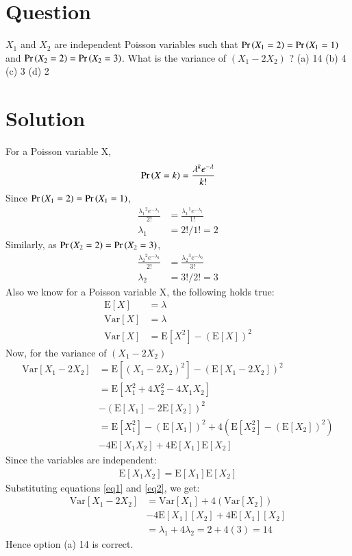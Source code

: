 \documentclass[journal,12pt,twocolumn]{IEEEtran}
\newcommand{\E}{\mathrm{E}}
\newcommand{\Var}{\mathrm{Var}}
\begin{document}
\section*{Question}
$X_1$ and $X_2$ are independent Poisson variables such that $\Pr\left(X_1=2\right) = \Pr\left(X_1=1\right)$ and $\Pr\left(X_2=2\right) = \Pr\left(X_2=3\right)$. What is the variance of $(X_1 - 2X_2)$ ?
\newline (a) 14
\newline (b) 4
\newline (c) 3
\newline (d) 2
\section*{Solution}
For a Poisson variable X,
\begin{align}
\Pr\left(X=k\right) = \frac{\lambda^{k}e^{-\lambda}}{k!}
\end{align}
Since $\Pr\left(X_1=2\right) = \Pr\left(X_1=1\right)$,
\begin{align}
\frac{{\lambda_1}^{2}e^{-{\lambda_1}}}{2!} &= \frac{{\lambda_1}^{1}e^{-{\lambda_1}}}{1!} \\
\lambda_1 &= 2!/1! = 2
\end{align}
Similarly, as $\Pr\left(X_2=2\right) = \Pr\left(X_2=3\right)$,
\begin{align}
\frac{{\lambda_2}^{2}e^{-{\lambda_2}}}{2!} &= \frac{{\lambda_2}^{3}e^{-{\lambda_2}}}{3!} \\
\lambda_2 &= 3!/2! = 3
\end{align}
Also we know for a Poisson variable X, the following holds true:
\begin{align}
\E[X] &= \lambda \\
\Var[X] &= \lambda \label{eq1} \\
\Var[X] &= \E[X^2] - (\E[X])^2 \label{eq2} 
\end{align}
Now, for the variance of $(X_1 - 2X_2)$
\begin{align}
\Var[X_1 - 2X_2] &= \E[(X_1 - 2X_2)^2] - (\E[X_1 - 2X_2])^2 \nonumber \\
&= \E[X_1^2 + 4X_2^2 - 4X_1X_2] \nonumber \\
&- (\E[X_1] - 2\E[X_2])^2 \nonumber \\
&= \E[X_1^2] - (\E[X_1])^2 + 4(\E[X_2^2]-(\E[X_2])^2) \nonumber \\
&- 4\E[X_1X_2]  + 4\E[X_1]\E[X_2]
\end{align}
Since the variables are independent:
\begin{align}
\E[X_1X_2] = \E[X_1]\E[X_2]
\end{align}
Substituting equations \eqref{eq1} and \eqref{eq2}, we get:
\begin{align}
\Var[X_1 - 2X_2] &= \Var[X_1] + 4(\Var[X_2]) \nonumber \\
&- 4\E[X_1][X_2] + 4\E[X_1][X_2] \nonumber \\
&= \lambda_1 + 4\lambda_2 = 2 + 4(3) = 14
\end{align}
Hence option (a) 14 is correct.
\end{document}
